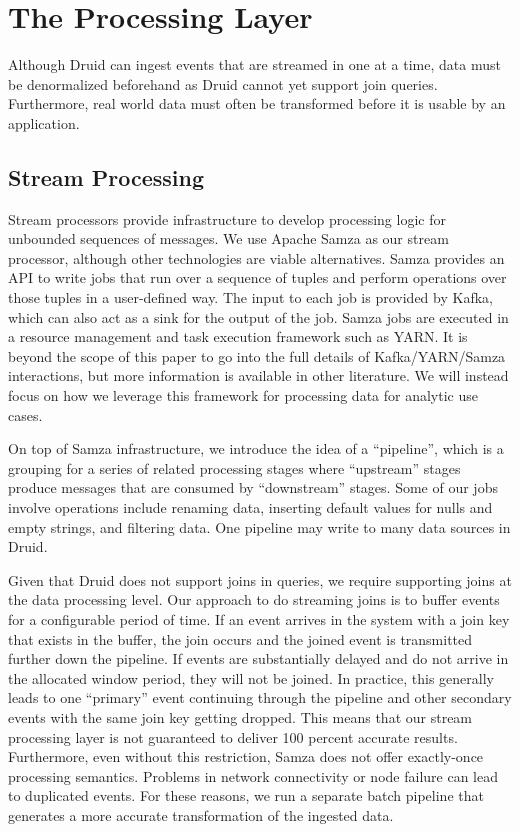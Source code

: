 \documentclass{vldb}
\begin{document}
{\section{The Processing Layer}
\label{sec:processing}
Although Druid can ingest events that are streamed in one at a time, data must
be denormalized beforehand as Druid cannot yet support
join queries. Furthermore, real world data must often be transformed before it
is usable by an application.

\subsection{Stream Processing}
\label{sec:streamprocessing}
Stream processors provide infrastructure to develop processing logic for
unbounded sequences of messages. We use Apache Samza as our stream processor,
although other technologies are viable alternatives. Samza provides an API to
write jobs that run over a sequence of tuples and perform operations over those
tuples in a user-defined way. The input to each job is provided by Kafka, which
can also act as a sink for the output of the job. Samza jobs are executed in a
resource management and task execution framework such as
YARN\cite{vavilapalli2013apache}. It is beyond the scope of this paper to go
into the full details of Kafka/YARN/Samza interactions, but more information is
available in other literature\cite{2014samza}. We will instead focus on how we
leverage this framework for processing data for analytic use cases.

On top of Samza infrastructure, we introduce the idea of a “pipeline”, which is
a grouping for a series of related processing stages where “upstream” stages
produce messages that are consumed by “downstream” stages. Some of our jobs
involve operations include renaming data, inserting default values for nulls
and empty strings, and filtering data. One pipeline may write to many data
sources in Druid.

Given that Druid does not support joins in queries, we require supporting joins
at the data processing level. Our approach to do streaming joins is to buffer
events for a configurable period of time. If an event arrives in the system
with a join key that exists in the buffer, the join occurs and the joined event
is transmitted further down the pipeline. If events are substantially delayed
and do not arrive in the allocated window period, they will not be joined. In
practice, this generally leads to one “primary” event continuing through the
pipeline and other secondary events with the same join key getting dropped.
This means that our stream processing layer is not guaranteed to deliver 100 percent 
accurate results. Furthermore, even without this restriction, Samza does not
offer exactly-once processing semantics. Problems in network connectivity or
node failure can lead to duplicated events. For these reasons, we run a
separate batch pipeline that generates a more accurate transformation of the
ingested data.

}
\end{document}
